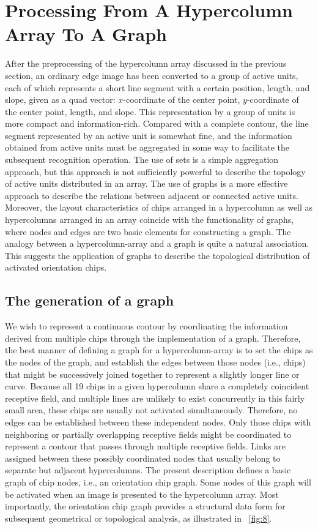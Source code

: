 \documentclass[journal]{IEEEtran}
\begin{document}
\section{Processing From A Hypercolumn Array To A Graph}

After the preprocessing of the hypercolumn array discussed in the previous section, 
an ordinary edge image has been converted to a group of active units, 
each of which represents a short line segment with a certain position, length, and slope, 
given as a quad vector: $x$-coordinate of the center point, 
$y$-coordinate of the center point, length, and slope. 
This representation by a group of units is more compact and information-rich. 
Compared with a complete contour, the line segment represented by an active unit is somewhat fine, 
and the information obtained from active units must be aggregated in some way to facilitate the subsequent recognition operation. 
The use of sets is a simple aggregation approach, 
but this approach is not sufficiently powerful to describe the topology of active units distributed in an array. 
The use of graphs is a more effective approach to describe the relations between adjacent or connected active units. 
Moreover, the layout characteristics of chips arranged in a hypercolumn as well as hypercolumns arranged in an array coincide with the functionality of graphs, 
where nodes and edges are two basic elements for constructing a graph. 
The analogy between a hypercolumn-array and a graph is quite a natural association. 
This suggests the application of graphs to describe the topological distribution of activated orientation chips.

\subsection{The generation of a graph}

We wish to represent a continuous contour by coordinating the information derived from multiple chips through the implementation of a graph. 
Therefore, the best manner of defining a graph for a hypercolumn-array is to set the chips as the nodes of the graph, 
and establish the edges between those nodes (i.e., chips) that might be successively joined together to represent a slightly longer line or curve. 
Because all 19 chips in a given hypercolumn share a completely coincident receptive field, 
and multiple lines are unlikely to exist concurrently in this fairly small area, 
these chips are usually not activated simultaneously.
Therefore, no edges can be established between these independent nodes. 
Only those chips with neighboring or partially overlapping receptive fields might be coordinated to represent a contour that passes through multiple receptive fields. 
Links are assigned between these possibly coordinated nodes that usually belong to separate but adjacent hypercolumns. 
The present description defines a basic graph of chip nodes, i.e., an orientation chip graph. 
Some nodes of this graph will be activated when an image is presented to the hypercolumn array. 
Most importantly, the orientation chip graph provides a structural data form for subsequent geometrical or topological analysis, as illustrated in \figurename~\ref{fig:8}.
\end{document}
